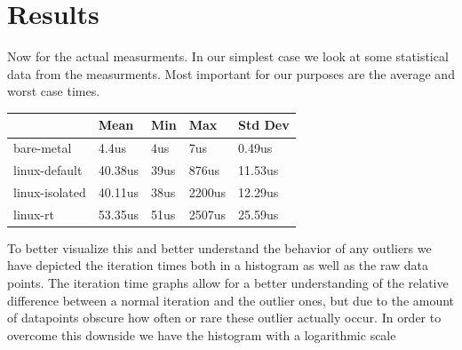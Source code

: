 \section{Results}
\label{sec:experiments:results}

Now for the actual measurments.
In our simplest case we look at some statistical data from the measurments.
Most important for our purposes are the average and worst case times.

\begin{table}[h!]
  \label{tab:measurments}
  \begin{tabular}{|l|l|l|l|l|}
    \hline
                   & Mean    & Min  & Max    & Std Dev \\ \hline
    bare-metal     & 4.4us   & 4us  & 7us    & 0.49us  \\ \hline
    linux-default  & 40.38us & 39us & 876us  & 11.53us \\ \hline
    linux-isolated & 40.11us & 38us & 2200us & 12.29us \\ \hline
    linux-rt       & 53.35us & 51us & 2507us & 25.59us \\ \hline
  \end{tabular}
\end{table}

To better visualize this and better understand the behavior of any outliers we have depicted the iteration times both in a histogram as well as the raw data points.
The iteration time graphs allow for a better understanding of the relative difference between a normal iteration and the outlier ones,
but due to the amount of datapoints obscure how often or rare these outlier actually occur.
In order to overcome this downside we have the histogram with a logarithmic scale

\makeatletter
\newcommand{\includesvggraphics}[2][\textwidth]{
  \filename@parse{#2}%
  
}
\makeatother

